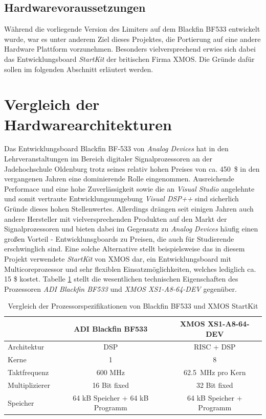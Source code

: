 \documentclass[paper=a4, fontsize=12pt]{scrartcl}
\numberwithin{equation}{section}		%
\numberwithin{figure}{section}			%
\numberwithin{table}{section}				%
\begin{document}
\subsection{Hardwarevoraussetzungen}
Während die vorliegende Version des Limiters auf dem Blackfin BF533 entwickelt wurde, war es unter anderem Ziel dieses Projektes, die Portierung auf eine andere Hardware Plattform vorzunehmen. Besonders vielversprechend erwies sich dabei das Entwicklungsboard \textit{StartKit} der britischen Firma XMOS. Die Gründe dafür sollen im folgenden Abschnitt erläutert werden.

\section{Vergleich der Hardwarearchitekturen}
Das Entwicklungsboard Blackfin BF-533 von \textit{Analog Devices} hat in den Lehrveranstaltungen im Bereich digitaler Signalprozessoren an der Jadehochschule Oldenburg trotz seines relativ hohen Preises von ca. 450~\$ in den vergangenen Jahren eine dominierende Rolle eingenommen. Ausreichende Performace und eine hohe Zuverlässigkeit sowie die an \textit{Visual Studio} angelehnte und somit vertraute Entwicklungsumgebung \textit{Visual DSP++} sind sicherlich Gründe dieses hohen Stellenwertes. Allerdings drängen seit einigen Jahren auch andere Hersteller mit vielversprechenden Produkten auf den Markt der Signalprozessoren und bieten dabei im Gegensatz zu \textit{Analog Devices} häufig einen großen Vorteil - Entwicklunsgboards zu Preisen, die auch für Studierende erschwinglich sind.
Eine solche Alternative stellt beispielsweise das in diesem Projekt verwendete \textit{StartKit} von XMOS dar, ein Entwicklungsboard mit Multicoreprozessor und sehr flexiblen Einsatzmöglichkeiten, welches lediglich ca. 15 \$ kostet. Tabelle \ref{tab:dps-vergleich} stellt die wesentlichen technischen Eigenschaften des Prozessoren \textit{ADI Blackfin BF533} und \textit{XMOS XS1-A8-64-DEV} gegenüber.
\begin{table}[h!]
\centering
\caption{Vergleich der Prozessorspezifikationen von Blackfin BF533 \cite{TechBF} und XMOS StartKit \cite{TechXMOS}}
\vspace{0.2cm}
  \begin{tabular}{l|cc}
    & ADI Blackfin BF533 & XMOS XS1-A8-64-DEV \\
    \hline
    Architektur 	& DSP 								& RISC + DSP \\
    Kerne 			& 1 									& 8 \\
    Taktfrequenz	& 600 MHz							& 62.5~MHz pro Kern \\
    Multiplizierer 	& 16 Bit fixed						& 32 Bit fixed \\
    Speicher		& 64 kB Speicher + 64 kB Programm 	& 64 kB Speicher + Programm \\
  \end{tabular}
      \label{tab:dps-vergleich}
  \end{table}
  
\end{document}
